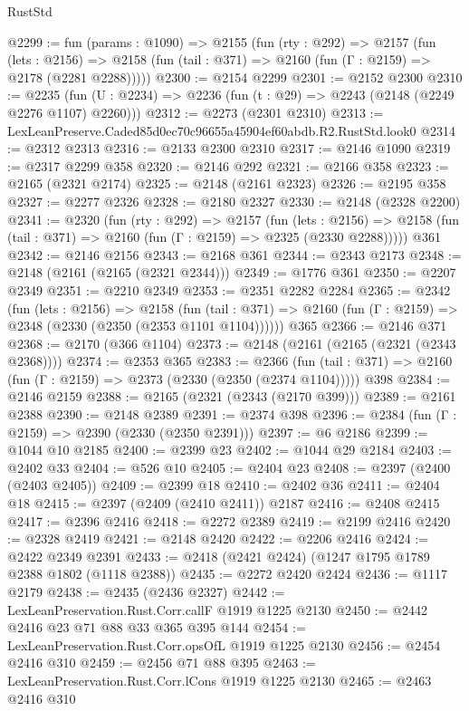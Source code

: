 \begin{lexlean}{RustStd}
\begin{coremodule}
@2299 := fun (params : @1090) =>
  @2155
    (fun (rty : @292) =>
    @2157
      (fun (lets : @2156) =>
      @2158 (fun (tail : @371) => @2160 (fun (Γ : @2159) => @2178 (@2281 @2288)))))
@2300 := @2154 @2299
@2301 := @2152 @2300
@2310 := @2235 (fun (U : @2234) => @2236 (fun (t : @29) => @2243 (@2148 (@2249 @2276 @1107) @2260)))
@2312 := @2273 (@2301 @2310)
@2313 := LexLeanPreserve.Caded85d0ec70c96655a45904ef60abdb.R2.RustStd.look0
@2314 := @2312 @2313
@2316 := @2133 @2300 @2310
@2317 := @2146 @1090
@2319 := @2317 @2299 @358
@2320 := @2146 @292
@2321 := @2166 @358
@2323 := @2165 (@2321 @2174)
@2325 := @2148 (@2161 @2323)
@2326 := @2195 @358
@2327 := @2277 @2326
@2328 := @2180 @2327
@2330 := @2148 (@2328 @2200)
@2341 := @2320
    (fun (rty : @292) =>
    @2157
      (fun (lets : @2156) =>
      @2158 (fun (tail : @371) => @2160 (fun (Γ : @2159) => @2325 (@2330 @2288)))))
    @361
@2342 := @2146 @2156
@2343 := @2168 @361
@2344 := @2343 @2173
@2348 := @2148 (@2161 (@2165 (@2321 @2344)))
@2349 := @1776 @361
@2350 := @2207 @2349
@2351 := @2210 @2349
@2353 := @2351 @2282 @2284
@2365 := @2342
    (fun (lets : @2156) =>
    @2158
      (fun (tail : @371) => @2160 (fun (Γ : @2159) => @2348 (@2330 (@2350 (@2353 @1101 @1104))))))
    @365
@2366 := @2146 @371
@2368 := @2170 (@366 @1104)
@2373 := @2148 (@2161 (@2165 (@2321 (@2343 @2368))))
@2374 := @2353 @365
@2383 := @2366
    (fun (tail : @371) => @2160 (fun (Γ : @2159) => @2373 (@2330 (@2350 (@2374 @1104)))))
    @398
@2384 := @2146 @2159
@2388 := @2165 (@2321 (@2343 (@2170 @399)))
@2389 := @2161 @2388
@2390 := @2148 @2389
@2391 := @2374 @398
@2396 := @2384 (fun (Γ : @2159) => @2390 (@2330 (@2350 @2391)))
@2397 := @6 @2186
@2399 := @1044 @10 @2185
@2400 := @2399 @23
@2402 := @1044 @29 @2184
@2403 := @2402 @33
@2404 := @526 @10
@2405 := @2404 @23
@2408 := @2397 (@2400 (@2403 @2405))
@2409 := @2399 @18
@2410 := @2402 @36
@2411 := @2404 @18
@2415 := @2397 (@2409 (@2410 @2411)) @2187
@2416 := @2408 @2415
@2417 := @2396 @2416
@2418 := @2272 @2389
@2419 := @2199 @2416
@2420 := @2328 @2419
@2421 := @2148 @2420
@2422 := @2206 @2416
@2424 := @2422 @2349 @2391
@2433 := @2418 (@2421 @2424) (@1247 @1795 @1789 @2388 @1802 (@1118 @2388))
@2435 := @2272 @2420 @2424
@2436 := @1117 @2179
@2438 := @2435 (@2436 @2327)
@2442 := LexLeanPreservation.Rust.Corr.callF @1919 @1225 @2130
@2450 := @2442 @2416 @23 @71 @88 @33 @365 @395 @144
@2454 := LexLeanPreservation.Rust.Corr.opsOfL @1919 @1225 @2130
@2456 := @2454 @2416 @310
@2459 := @2456 @71 @88 @395
@2463 := LexLeanPreservation.Rust.Corr.lCons @1919 @1225 @2130
@2465 := @2463 @2416 @310

\end{coremodule}
\end{lexlean}

